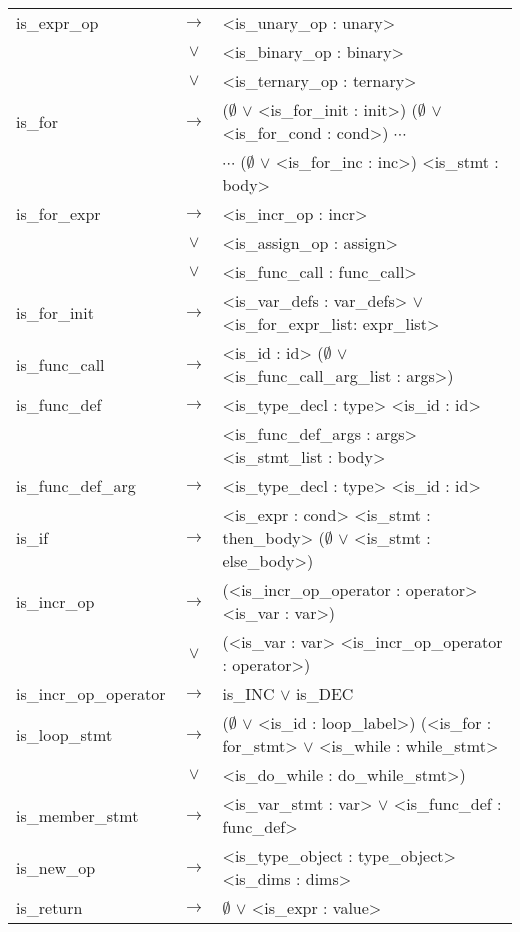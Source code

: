 \documentclass[a4paper]{article}
\begin{document}
\begin{longtable}{lcl}
	is\_expr\_op				& $\to$ & <is\_unary\_op : unary> \\
								& $\vee$ & <is\_binary\_op : binary>\\
								& $\vee$ & <is\_ternary\_op : ternary>\\
	is\_for						& $\to$ & ($\emptyset$ $\vee$ <is\_for\_init : init>) ($\emptyset$ $\vee$ <is\_for\_cond : cond>) $\cdots$ \\
								&       & $\cdots$ ($\emptyset$ $\vee$ <is\_for\_inc : inc>) <is\_stmt : body> \\
	is\_for\_expr				& $\to$ & <is\_incr\_op : incr> \\
								& $\vee$ & <is\_assign\_op : assign> \\
								& $\vee$ & <is\_func\_call : func\_call> \\
	is\_for\_init				& $\to$ & <is\_var\_defs : var\_defs> $\vee$ <is\_for\_expr\_list: expr\_list> \\
	is\_func\_call				& $\to$ & <is\_id : id> ($\emptyset$ $\vee$ <is\_func\_call\_arg\_list : args>) \\
	is\_func\_def				& $\to$ & <is\_type\_decl : type> <is\_id : id> \\ %
								&       & <is\_func\_def\_args : args> <is\_stmt\_list : body> \\
	is\_func\_def\_arg			& $\to$ & <is\_type\_decl : type> <is\_id : id> \\
	is\_if						& $\to$ & <is\_expr : cond> <is\_stmt : then\_body> ($\emptyset$ $\vee$ <is\_stmt : else\_body>) \\
	is\_incr\_op				& $\to$ &(<is\_incr\_op\_operator : operator> <is\_var : var>) \\
								& $\vee$ & (<is\_var : var> <is\_incr\_op\_operator : operator>) \\
	is\_incr\_op\_operator		& $\to$ & is\_INC $\vee$ is\_DEC \\
	is\_loop\_stmt				& $\to$ & ($\emptyset$ $\vee$ <is\_id : loop\_label>) (<is\_for : for\_stmt> $\vee$ <is\_while : while\_stmt> \\ 
								& $\vee$ & <is\_do\_while : do\_while\_stmt>) \\
	is\_member\_stmt			& $\to$ & <is\_var\_stmt : var> $\vee$ <is\_func\_def : func\_def> \\
	is\_new\_op					& $\to$ & <is\_type\_object : type\_object> <is\_dims : dims> \\
	is\_return					& $\to$ & $\emptyset$ $\vee$ <is\_expr : value> \\

\end{longtable}
\end{document}
